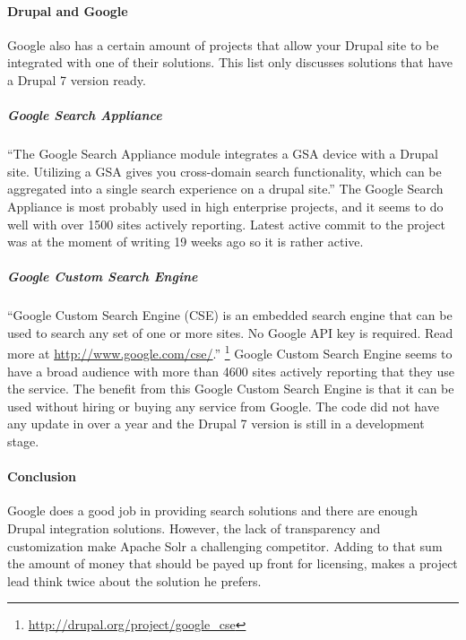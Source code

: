 \paragraph{Drupal and Google}
Google also has a certain amount of projects that allow your Drupal site to be integrated with one of their solutions. This list only discusses solutions that have a Drupal 7 version ready.
\subparagraph{Google Search Appliance}
“The Google Search Appliance module integrates a GSA device with a Drupal site. Utilizing a GSA gives you cross-domain search functionality, which can be aggregated into a single search experience on a drupal site.”
The Google Search Appliance is most probably used in high enterprise projects, and it seems to do well with over 1500 sites actively reporting. Latest active commit to the project was at the moment of writing 19 weeks ago so it is rather active.
\subparagraph{Google Custom Search Engine}
“Google Custom Search Engine (CSE) is an embedded search engine that can be used to search any set of one or more sites. No Google API key is required. Read more at \url{http://www.google.com/cse/}.” \footnote{\url{http://drupal.org/project/google_cse}} 
Google Custom Search Engine seems to have a broad audience with more than 4600 sites actively reporting that they use the service. The benefit from this Google Custom Search Engine is that it can be used without hiring or buying any service from Google. The code did not have any update in over a year and the Drupal 7 version is still in a development stage.

\paragraph{Conclusion}
Google does a good job in providing search solutions and there are enough Drupal integration solutions. However, the lack of transparency and customization make Apache Solr a challenging competitor. Adding to that sum the amount of money that should be payed up front for licensing, makes a project lead think twice about the solution he prefers.